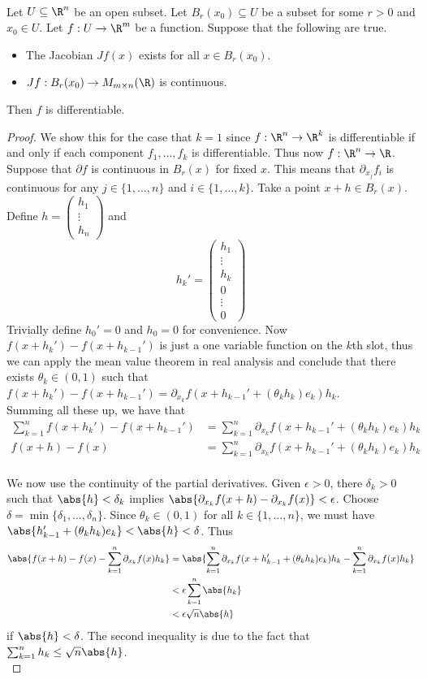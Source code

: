 \documentclass[a4paper]{article}
\begin{document}
\begin{prp}{}{}\\
Let $U\subseteq\R^n$ be an open subset. Let $B_r(x_0)\subseteq U$ be a subset for some $r>0$ and $x_0\in U$. Let $f:U\to\R^m$ be a function. Suppose that the following are true. 
\begin{itemize}
\item The Jacobian $Jf(x)$ exists for all $x\in B_r(x_0)$. 
\item $Jf:B_r(x_0)\to M_{m\times n}(\R)$ is continuous. 
\end{itemize}
Then $f$ is differentiable. 
\begin{proof}
We show this for the case that $k=1$ since $f:\R^n\to\R^k$ is differentiable if and only if each component $f_1,\dots,f_k$ is differentiable. Thus now $f:\R^n\to\R$. Suppose that $\partial f$ is continuous in $B_r(x)$ for fixed $x$. This means that $\partial_{x_j}f_i$ is continuous for any $j\in\{1,\dots,n\}$ and $i\in\{1,\dots,k\}$. Take a point $x+h\in B_r(x)$. Define $h=\begin{pmatrix}
h_1\\ \vdots\\ h_n
\end{pmatrix}$ and $$h_k'=\begin{pmatrix}h_1\\\vdots\\ h_k\\0\\\vdots\\0\end{pmatrix}$$ Trivially define $h_0'=0$ and $h_0=0$ for convenience. Now $f(x+h_k')-f(x+h_{k-1}')$ is just a one variable function on the $k$th slot, thus we can apply the mean value theorem in real analysis and conclude that there exists $\theta_{k}\in(0,1)$ such that $f(x+h_k')-f(x+h_{k-1}')=\partial_{x_k}f(x+h_{k-1}'+(\theta_kh_k)e_k)h_k$. \\
Summing all these up, we have that 
\begin{align*}
\sum_{k=1}^nf(x+h_k')-f(x+h_{k-1}')&=\sum_{k=1}^n\partial_{x_k}f(x+h_{k-1}'+(\theta_kh_k)e_k)h_k\\
f(x+h)-f(x)&=\sum_{k=1}^n\partial_{x_k}f(x+h_{k-1}'+(\theta_kh_k)e_k)h_k
\end{align*}~\\

We now use the continuity of the partial derivatives. Given $\epsilon>0$, there $\delta_k>0$ such that $\abs{h}<\delta_k$ implies $\abs{\partial_{x_k}f(x+h)-\partial_{x_k}f(x)}<\epsilon$. Choose $\delta=\min\{\delta_1,\dots,\delta_n\}$. Since $\theta_k\in(0,1)$ for all $k\in\{1,\dots,n\}$, we must have $\abs{h_{k-1}'+(\theta_kh_k)e_k}<\abs{h}<\delta$. Thus
\begin{align*}
\abs{f(x+h)-f(x)-\sum_{k=1}^n\partial_{x_k}f(x)h_k}&=\abs{\sum_{k=1}^n\partial_{x_k}f(x+h_{k-1}'+(\theta_kh_k)e_k)h_k-\sum_{k=1}^n\partial_{x_k}f(x)h_k}\\
&<\epsilon\sum_{k=1}^n\abs{h_k}\\
&<\epsilon\sqrt{n}\abs{h}
\end{align*}
if $\abs{h}<\delta$. The second inequality is due to the fact that $\sum_{k=1}^nh_k\leq\sqrt{n}\abs{h}$. \\


\end{proof}
\end{prp}
\end{document}
